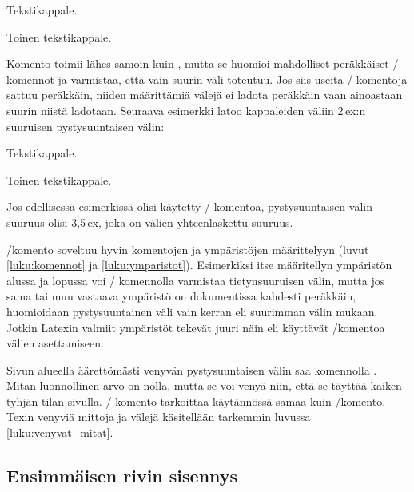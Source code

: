 \begin{koodilohkosis}
  Tekstikappale.
  \vspace{5ex plus 1ex minus .5ex}

  Toinen tekstikappale.
\end{koodilohkosis}

Komento  toimii lähes samoin kuin ,
mutta se huomioi mahdolliset peräkkäiset \-/ komennot
ja varmistaa, että vain suurin väli toteutuu. Jos siis useita
\-/ komentoja sattuu peräkkäin, niiden määrittämiä
välejä ei ladota peräkkäin vaan ainoastaan suurin niistä ladotaan.
Seuraava esimerkki latoo kappaleiden väliin 2\,ex:n suuruisen
pystysuuntaisen välin:

\begin{koodilohkosis}
  Tekstikappale.

  \addvspace{1ex} \addvspace{2ex} \addvspace{.5ex}
  Toinen tekstikappale.
\end{koodilohkosis}

Jos edellisessä esimerkissä olisi käytetty \-/ komentoa,
pystysuuntaisen välin suuruus olisi 3,5\,ex, joka on välien
yhteenlaskettu suuruus.

\-/komento soveltuu hyvin komentojen ja ympäristöjen
määrittelyyn (luvut \ref{luku:komennot} ja \ref{luku:ymparistot}).
Esimerkiksi itse määritellyn ympäristön alussa ja lopussa voi
\-/ komennolla varmistaa tietynsuuruisen välin, mutta
jos sama tai muu vastaava ympäristö on dokumentissa kahdesti peräkkäin,
huomioidaan pystysuuntainen väli vain kerran eli suurimman välin mukaan.
Jotkin Latexin valmiit ympäristöt tekevät juuri näin eli käyttävät
\-/komentoa välien asettamiseen.

Sivun alueella äärettömästi venyvän pystysuuntaisen välin saa komennolla
. Mitan luonnollinen arvo on nolla, mutta se voi venyä
niin, että se täyttää kaiken tyhjän tilan sivulla. \-/
komento tarkoittaa käytännössä samaa kuin  \=/komento. Texin venyviä mittoja ja välejä käsitellään
tarkemmin luvussa \ref{luku:venyvat_mitat}.

\subsection{Ensimmäisen rivin sisennys}
\label{luku:ensimmaisen_rivin_sisennys}

